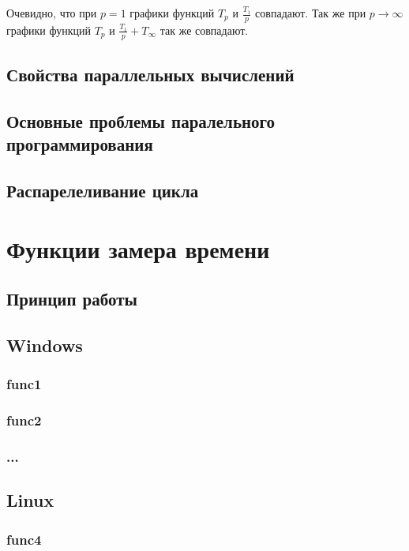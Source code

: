 \documentclass{article}
\begin{document}
			Очевидно, что при $p = 1$ графики функций $T_p$ и $\frac{T_1}{p}$ совпадают. Так же при $p\to\infty$  графики функций $T_p$ и $\frac{T_1}{p}+T_\infty$ так же совпадают.
			
		\subsection{Свойства параллельных вычислений}
		\subsection{Основные проблемы паралельного программирования}
		\subsection{Распарелеливание цикла}
	\newpage
	\section{Функции замера времени}
		\subsection{Принцип работы}
		\subsection{Windows}
			\subsubsection{func1}
			\subsubsection{func2}
			\subsubsection{...}
		\subsection{Linux}
			\subsubsection{func4}
\end{document}
